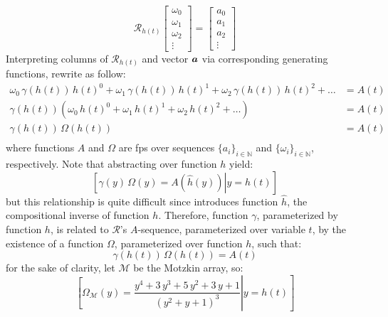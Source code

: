 \begin{displaymath}
    \mathcal{R}_{h(t)}\left[\begin{array}{c} \omega_0 \\ \omega_1 \\ \omega_2 \\ \vdots \end{array}\right] =
        \left[\begin{array}{c} a_0 \\ a_1 \\ a_2 \\ \vdots \end{array}\right]
\end{displaymath}
Interpreting columns of $\mathcal{R}_{h(t)}$ and vector $\boldsymbol{a}$ via
corresponding generating functions, rewrite as follow:
\begin{displaymath}
    \begin{split}
            \omega_0\,\gamma(h(t))\,h(t)^{0} + 
            \omega_1\,\gamma(h(t))\,h(t)^{1} + 
            \omega_2\,\gamma(h(t))\,h(t)^{2} + 
            \ldots &= A(t) \\
            \gamma(h(t))\left(\omega_0\,h(t)^{0} + 
            \omega_1\,h(t)^{1} + 
            \omega_2\,h(t)^{2} + 
            \ldots \right) &= A(t) \\
            \gamma(h(t))\,\Omega(h(t)) &= A(t) \\
    \end{split}
\end{displaymath}
where functions $A$ and $\Omega$ are \ac{fps} over sequences
$\lbrace a_i \rbrace_{i\in\mathbb{N}}$ and
$\lbrace \omega_i \rbrace_{i\in\mathbb{N}}$, respectively. Note that abstracting
over function $h$ yield:
\begin{displaymath}
    \left.\left[
        \gamma(y)\,\Omega(y) = A(\hat{h}(y)) \right| y = h(t) \right]
\end{displaymath}
but this relationship is quite difficult since introduces function $\hat{h}$,
the compositional inverse of function $h$. Therefore, function
$\gamma$, parameterized by function $h$, is related to $\mathcal{R}$'s
$A$-sequence, parameterized over variable $t$, by the existence of 
a function $\Omega$, parameterized over function $h$, such that:
\begin{displaymath}
    \gamma(h(t))\,\Omega(h(t)) = A(t) 
\end{displaymath}
for the sake of clarity, let $\mathcal{M}$ be the Motzkin array, so:
\begin{displaymath}
        \left.\left[
            \Omega_{\mathcal{M}}(y) = \frac{y^{4} + 3 \, y^{3} + 5 \, y^{2} + 3 \, y + 1}{{\left(y^{2} + y + 1\right)}^{3}}
                \right| y = h(t) \right]
\end{displaymath}
